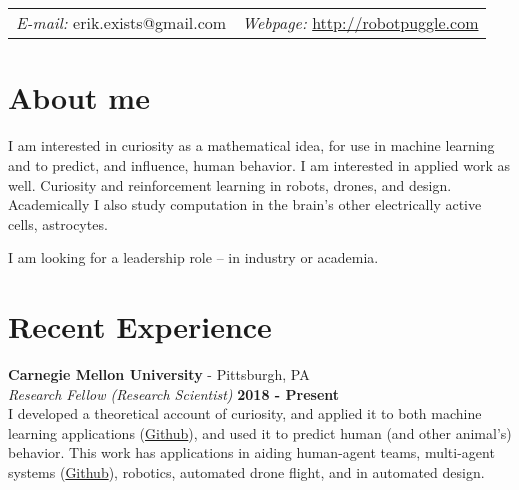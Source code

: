 \documentclass[margin,line]{res}
\begin{document}
\newcommand{\link}[1]{\texttt{#1}}
\providecommand{\tightlist}{%
    \setlength{\itemsep}{0pt}\setlength{\parskip}{0pt}}



\begin{resume}
\section{\sc }
\vspace{.05in}

\begin{tabular}{@{}p{2in}p{4in}}
{\it E-mail:}  erik.exists@gmail.com   & {\it Webpage:} \href{http://robotpuggle.com}{http://robotpuggle.com} \\
\end{tabular}

\vspace{-.1cm}
\section{\sc About me}
I am interested in curiosity as a mathematical idea, for use in machine learning and to predict, and influence, human behavior. I am interested in applied work as well. Curiosity and reinforcement learning in robots, drones, and design. Academically I also study computation in the brain’s other electrically active cells, astrocytes. 

\vspace{-.3cm}
I am looking for a leadership role -- in industry or academia.

\section{\sc Recent Experience}
\vspace{-.2cm}
{\bf Carnegie Mellon University} - Pittsburgh, PA \\
{\em Research Fellow (Research Scientist)} \hfill {\bf 2018 - Present}\\
I developed a theoretical account of curiosity, and applied it to both machine learning applications (\href{https://github.com/CoAxLab/infomercial}{Github}), and used it to predict human (and other animal's) behavior. This work has applications in aiding human-agent teams, multi-agent systems (\href{https://github.com/parenthetical-e/parkid}{Github}), robotics, automated drone flight, and in automated design.


\end{resume}
\end{document}
